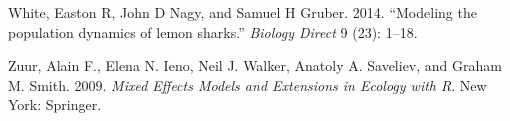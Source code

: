 \documentclass[12pt,]{article}
\begin{document}
\begin{spacing}{2}
\hypertarget{ref-White2014}{}
White, Easton R, John D Nagy, and Samuel H Gruber. 2014. ``Modeling the
population dynamics of lemon sharks.'' \emph{Biology Direct} 9 (23):
1--18.

\hypertarget{ref-Zuur2009}{}
Zuur, Alain F., Elena N. Ieno, Neil J. Walker, Anatoly A. Saveliev, and
Graham M. Smith. 2009. \emph{Mixed Effects Models and Extensions in
Ecology with R}. New York: Springer.


\end{spacing}
\end{document}
